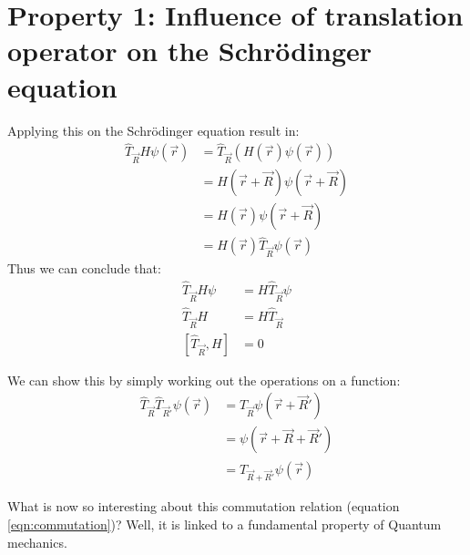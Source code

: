 \section{Property 1: Influence of translation operator on the Schrödinger equation} \label{sec:property1}
Applying this on the Schrödinger equation result in:
\begin{align}
	\hat{T}_{\vec{R}}H\psi(\vec{r}) &= \hat{T}_{\vec{R}}(H(\vec{r})\psi(\vec{r}))\\
	&= H(\vec{r} + \vec{R})\psi(\vec{r} + \vec{R})\\
	&= H(\vec{r})\psi(\vec{r} + \vec{R})\\
	&= H(\vec{r})\hat{T}_{\vec{R}}\psi(\vec{r})
\end{align}
Thus we can conclude that:
\begin{align}
	\hat{T}_{\vec{R}}H\psi &= H\hat{T}_{\vec{R}}\psi \\
	\hat{T}_{\vec{R}}H &= H\hat{T}_{\vec{R}} \\
	\left[\hat{T}_{\vec{R}}, H\right] &= 0 \label{eqn:commutation}
\end{align}
\begin{myproof}
	We can show this by simply working out the operations on a function:
	\begin{align}
		\hat{T}_{\vec{R}}\hat{T}_{\vec{R}'}\psi(\vec{r}) &= \hat{T}_{\vec{R}}\psi(\vec{r} + \vec{R}') \\
		&= \psi(\vec{r} + \vec{R} + \vec{R}') \\
		&= \hat{T}_{\vec{R} + \vec{R}'}\psi(\vec{r})
	\end{align}
\end{myproof}
What is now so interesting about this commutation relation (equation \ref{eqn:commutation})? Well, it is linked to a fundamental property of Quantum mechanics.
